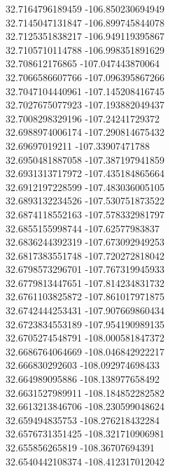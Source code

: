 {32.7164796189459	-106.850230694949\\
32.7145047131847	-106.899745844078\\
32.7125351838217	-106.949119395867\\
32.7105710114788	-106.998351891629\\
32.708612176865	-107.047443870064\\
32.7066586607766	-107.096395867266\\
32.7047104440961	-107.145208416745\\
32.7027675077923	-107.193882049437\\
32.7008298329196	-107.24241729372\\
32.6988974006174	-107.290814675432\\
32.69697019211	-107.33907471788\\
32.6950481887058	-107.387197941859\\
32.6931313717972	-107.435184865664\\
32.6912197228599	-107.483036005105\\
32.6893132234526	-107.530751873522\\
32.6874118552163	-107.578332981797\\
32.6855155998744	-107.62577983837\\
32.6836244392319	-107.673092949253\\
32.6817383551748	-107.720272818042\\
32.6798573296701	-107.767319945933\\
32.6779813447651	-107.814234831732\\
32.6761103825872	-107.861017971875\\
32.6742444253431	-107.907669860434\\
32.6723834553189	-107.954190989135\\
32.6705274548791	-108.000581847372\\
32.6686764064669	-108.046842922217\\
32.666830292603	-108.092974698433\\
32.664989095886	-108.138977658492\\
32.6631527989911	-108.184852282582\\
32.6613213846706	-108.230599048624\\
32.659494835753	-108.276218432284\\
32.6576731351425	-108.321710906981\\
32.655856265819	-108.36707694391\\
32.6540442108374	-108.412317012042\\
}
